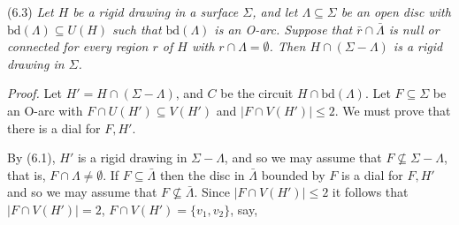 \stmt
(6.3) \textit{Let $H$ be a rigid drawing in a surface $\Sigma$, and let $\Lambda \subseteq \Sigma$ be an open disc with $\text{bd}(\Lambda) \subseteq U(H)$ such that $\text{bd}(\Lambda)$ is an O-arc. Suppose that $\bar{r} \cap \bar{\Lambda}$ is null or connected for every region $r$ of $H$ with $r \cap \Lambda = \emptyset$. Then $H \cap (\Sigma - \Lambda)$ is a rigid drawing in $\Sigma$.}

\textit{Proof.} Let $H' = H \cap (\Sigma - \Lambda)$, and $C$ be the circuit $H \cap \text{bd}(\Lambda)$. Let $F \subseteq \Sigma$ be an O-arc with $F \cap U(H') \subseteq V(H')$ and $|F \cap V(H')| \le 2$. We must prove that there is a dial for $F, H'$.

By (6.1), $H'$ is a rigid drawing in $\Sigma - \Lambda$, and so we may assume that $F \not\subseteq \Sigma - \Lambda$, that is, $F \cap \Lambda \ne \emptyset$. If $F \subseteq \bar{\Lambda}$ then the disc in $\bar{\Lambda}$ bounded by $F$ is a dial for $F, H'$ and so we may assume that $F \not\subseteq \bar{\Lambda}$. Since $|F \cap V(H')| \le 2$ it follows that $|F \cap V(H')| = 2$, $F \cap V(H') = \{v_1, v_2\}$, say,

